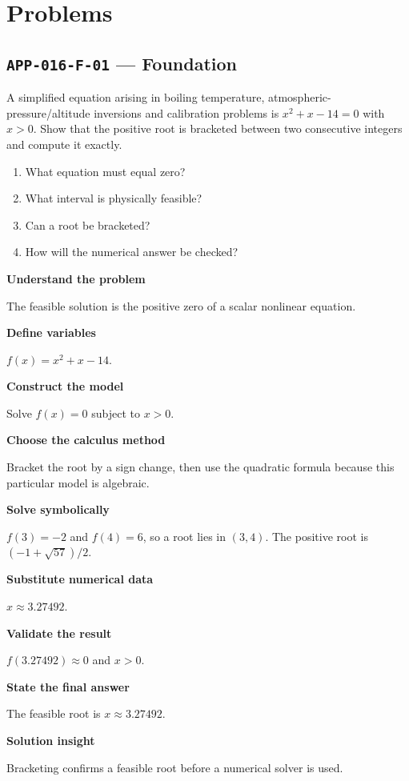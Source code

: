 \documentclass[11pt]{book}
\newcommand{\pid}[1]{\texttt{#1}}
\begin{document}
\section*{Problems}
\subsection*{\pid{APP-016-F-01} — Foundation}
\begin{problembox}
A simplified equation arising in boiling temperature, atmospheric-pressure/altitude inversions and calibration problems is $x^2+x-14=0$ with $x>0$. Show that the positive root is bracketed between two consecutive integers and compute it exactly.
\end{problembox}
\begin{promptbox}\begin{enumerate}
\item What equation must equal zero?
\item What interval is physically feasible?
\item Can a root be bracketed?
\item How will the numerical answer be checked?
\end{enumerate}\end{promptbox}
\begin{solutionbox}
\textbf{Understand the problem}\par The feasible solution is the positive zero of a scalar nonlinear equation.\par\medskip
\textbf{Define variables}\par $f(x)=x^2+x-14$.\par\medskip
\textbf{Construct the model}\par Solve $f(x)=0$ subject to $x>0$.\par\medskip
\textbf{Choose the calculus method}\par Bracket the root by a sign change, then use the quadratic formula because this particular model is algebraic.\par\medskip
\textbf{Solve symbolically}\par $f(3)=-2$ and $f(4)=6$, so a root lies in $(3,4)$. The positive root is $(-1+\sqrt{57})/2$.\par\medskip
\textbf{Substitute numerical data}\par $x\approx 3.27492$.\par\medskip
\textbf{Validate the result}\par $f(3.27492)\approx 0$ and $x>0$.\par\medskip
\textbf{State the final answer}\par The feasible root is $x\approx 3.27492$.\par\medskip
\textbf{Solution insight}\par Bracketing confirms a feasible root before a numerical solver is used.\par\medskip
\end{solutionbox}
\end{document}
